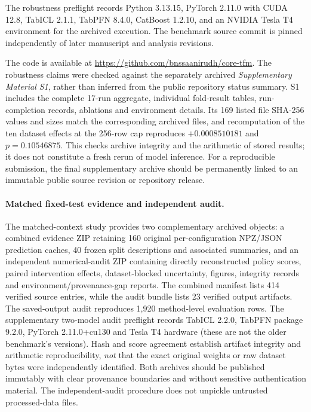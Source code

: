\documentclass[a4paper,fleqn]{cas-sc}
\begin{document}
The robustness preflight records Python 3.13.15, PyTorch 2.11.0 with CUDA 12.8, TabICL 2.1.1, TabPFN 8.4.0, CatBoost 1.2.10, and an NVIDIA Tesla T4 environment for the archived execution. The benchmark source commit is pinned independently of later manuscript and analysis revisions.

The code is available at \url{https://github.com/bnssaanirudh/core-tfm}. The robustness claims were checked against the separately archived \emph{Supplementary Material S1}, rather than inferred from the public repository status summary. S1 includes the complete 17-run aggregate, individual fold-result tables, run-completion records, ablations and environment details. Its 169 listed file SHA-256 values and sizes match the corresponding archived files, and recomputation of the ten dataset effects at the 256-row cap reproduces $+0.0008510181$ and $p=0.10546875$. This checks archive integrity and the arithmetic of stored results; it does not constitute a fresh rerun of model inference. For a reproducible submission, the final supplementary archive should be permanently linked to an immutable public source revision or repository release.


\paragraph{Matched fixed-test evidence and independent audit.}
The matched-context study provides two complementary archived objects: a combined evidence ZIP retaining 160 original per-configuration NPZ/JSON prediction caches, 40 frozen split descriptions and associated summaries, and an independent numerical-audit ZIP containing directly reconstructed policy scores, paired intervention effects, dataset-blocked uncertainty, figures, integrity records and environment/provenance-gap reports. The combined manifest lists 414 verified source entries, while the audit bundle lists 23 verified output artifacts. The saved-output audit reproduces 1,920 method-level evaluation rows. The supplementary two-model audit preflight records TabICL 2.2.0, TabPFN package 9.2.0, PyTorch 2.11.0+cu130 and Tesla T4 hardware (these are not the older benchmark's versions). Hash and score agreement establish artifact integrity and arithmetic reproducibility, \emph{not} that the exact original weights or raw dataset bytes were independently identified. Both archives should be published immutably with clear provenance boundaries and without sensitive authentication material. The independent-audit procedure does not unpickle untrusted processed-data files.
\end{document}
